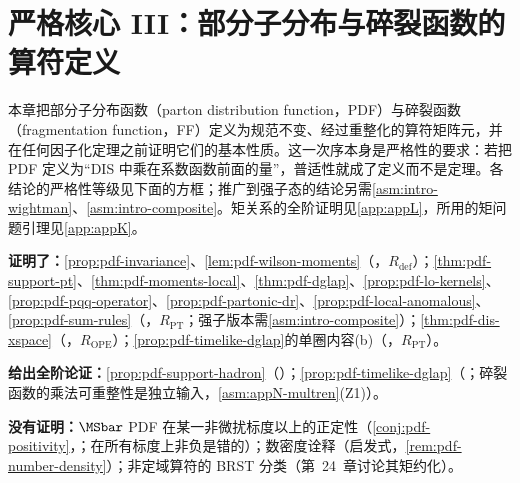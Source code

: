 \chapter{严格核心 III：部分子分布与碎裂函数的算符定义}\label{ch:pdf}

本章把部分子分布函数（parton distribution function，PDF）与碎裂函数（fragmentation function，FF）定义为规范不变、经过重整化的算符矩阵元，并在任何因子化定理之前证明它们的基本性质。这一次序本身是严格性的要求：若把 PDF 定义为“DIS 中乘在系数函数前面的量”，普适性就成了定义而不是定理。各结论的严格性等级见下面的方框；推广到强子态的结论另需\cref{asm:intro-wightman}、\cref{asm:intro-composite}。矩关系的全阶证明见\cref{app:appL}，所用的矩问题引理见\cref{app:appK}。

\begin{tcolorbox}[enhanced,breakable,title=本章证明了什么／没有证明什么,fonttitle=\bfseries,
  colback=gray!3!white,colframe=gray!55!black,boxrule=0.6pt,arc=2pt,
  left=5pt,right=5pt,top=3pt,bottom=3pt,before skip=6pt,after skip=6pt]
\textbf{证明了：}\cref{prop:pdf-invariance}、\cref{lem:pdf-wilson-moments}（\tagR，$R_{\mathrm{def}}$）；\cref{thm:pdf-support-pt}、\cref{thm:pdf-moments-local}、\cref{thm:pdf-dglap}、\cref{prop:pdf-lo-kernels}、\cref{prop:pdf-pqq-operator}、\cref{prop:pdf-partonic-dr}、\cref{prop:pdf-local-anomalous}、\cref{prop:pdf-sum-rules}（\tagR，$R_{\mathrm{PT}}$；强子版本需\cref{asm:intro-composite}）；\cref{thm:pdf-dis-xspace}（\tagR，$R_{\mathrm{OPE}}$）；\cref{prop:pdf-timelike-dglap}的单圈内容(b)（\tagR，$R_{\mathrm{PT}}$）。\par
\textbf{给出全阶论证：}\cref{prop:pdf-support-hadron}（\tagA）；\cref{prop:pdf-timelike-dglap}（\tagA；碎裂函数的乘法可重整性是独立输入，\cref{asm:appN-multren}(Z1)）。\par
\textbf{没有证明：}$\MSbar$ PDF 在某一非微扰标度以上的正定性（\cref{conj:pdf-positivity}，\tagC；在所有标度上非负是错的）；数密度诠释（启发式，\cref{rem:pdf-number-density}）；非定域算符的 BRST 分类（第~24~章讨论其矩约化）。
\end{tcolorbox}

